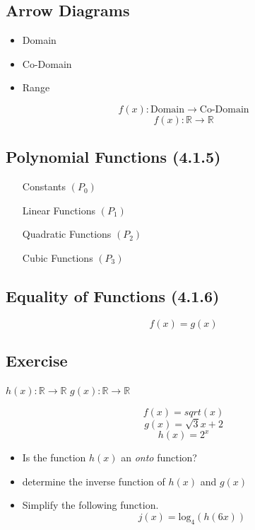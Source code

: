 \documentclass[]{report}
\begin{document}
\begin{enumerate}
\section{Arrow Diagrams}

\begin{itemize}

\item Domain
\item Co-Domain
\item Range
\end{itemize}
\[  f(x) : \mbox{Domain} \rightarrow \mbox{Co-Domain} \]
\[  f(x) : \mathbb{R} \rightarrow \mathbb{R} \]
\newpage
\subsection*{Polynomial Functions (4.1.5)}

\begin{itemize}
\item[Constants] $(P_0)$
\item[Linear Functions] $(P_1)$
\item[Quadratic Functions] $(P_2)$
\item[Cubic Functions] $(P_3)$
\end{itemize}


\subsection*{Equality of Functions (4.1.6)}
\[f(x) = g(x) \]




\subsection{Exercise} 
$h(x): \mathbb{R} \rightarrow \mathbb{R}$ 
$g(x): \mathbb{R} \rightarrow \mathbb{R}$

\[f(x) = sqrt(x)\]
\[g(x) = \sqrt{3}{x+2}\]
\[h(x) = 2^x\]

\begin{itemize}
\item Is the function $h(x)$ an \textit{onto} function?
\item determine the inverse function of $h(x)$ and $g(x)$
\item Simplify the following function.
\[ j(x) = \mbox{log}_4(h(6x))\]
\end{itemize}

\end{enumerate}
\end{document}
